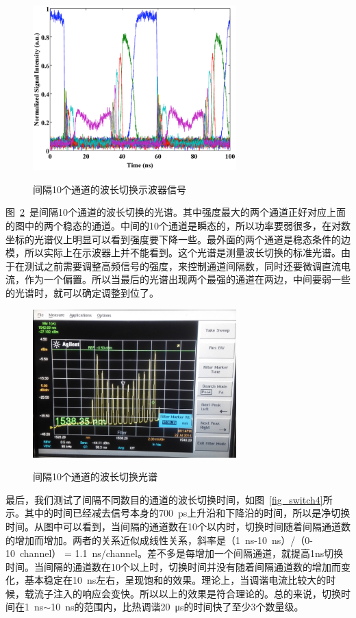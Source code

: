 \documentclass{ZJUthesis}
\begin{document}
\begin{figure}[htbp]
  \centering
  \includegraphics[width=0.7\textwidth]{./Pictures/switch2.eps}\\
  \caption{间隔10个通道的波长切换示波器信号}
  \label{fig_switch2}
\end{figure}

图~\ref{fig_switch3}~是间隔10个通道的波长切换的光谱。其中强度最大的两个通道正好对应上面的图中的两个稳态的通道。中间的10个通道是瞬态的，所以功率要弱很多，在对数坐标的光谱仪上明显可以看到强度要下降一些。最外面的两个通道是稳态条件的边模，所以实际上在示波器上并不能看到。这个光谱是测量波长切换的标准光谱。由于在测试之前需要调整高频信号的强度，来控制通道间隔数，同时还要微调直流电流，作为一个偏置。所以当最后的光谱出现两个最强的通道在两边，中间要弱一些的光谱时，就可以确定调整到位了。

\begin{figure}[htbp]
  \centering
  \includegraphics[width=0.7\textwidth]{./Pictures/switch3.eps}\\
  \caption{间隔10个通道的波长切换光谱}
  \label{fig_switch3}
\end{figure}

最后，我们测试了间隔不同数目的通道的波长切换时间，如图~\ref{fig_switch4}所示。其中的时间已经减去信号本身的700~ps上升沿和下降沿的时间，所以是净切换时间。从图中可以看到，当间隔的通道数在10个以内时，切换时间随着间隔通道数的增加而增加。两者的关系近似成线性关系，斜率是（1~ns-10~ns）/（0-10~channel） = 1.1~ns/channel。差不多是每增加一个间隔通道，就提高1ns切换时间。当间隔的通道数在10个以上时，切换时间并没有随着间隔通道数的增加而变化，基本稳定在10~ns左右，呈现饱和的效果。理论上，当调谐电流比较大的时候，载流子注入的响应会变快\cite{Liu2010Static}。所以以上的效果是符合理论的。总的来说，切换时间在1~ns$\sim$10~ns的范围内，比热调谐20~μs的时间快了至少3个数量级。
\end{document}
